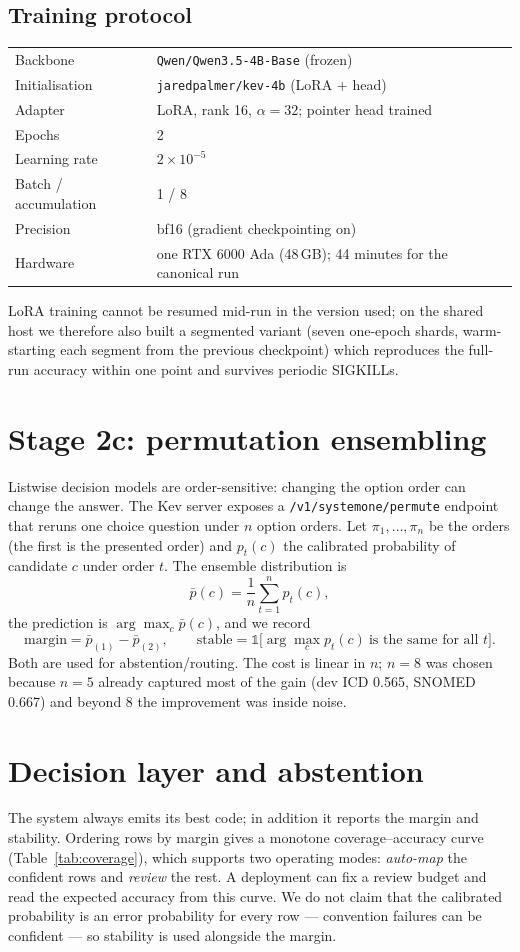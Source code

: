 \documentclass[11pt]{article}
\newcommand{\code}[1]{\texttt{#1}}
\begin{document}
\subsection{Training protocol}
\begin{table}[H]
\centering
\small
\begin{tabular}{@{}ll@{}}
\toprule
Backbone & \code{Qwen/Qwen3.5-4B-Base} (frozen) \\
Initialisation & \code{jaredpalmer/kev-4b} (LoRA + head) \\
Adapter & LoRA, rank 16, $\alpha=32$; pointer head trained \\
Epochs & 2 \\
Learning rate & $2\times10^{-5}$ \\
Batch / accumulation & 1 / 8 \\
Precision & bf16 (gradient checkpointing on) \\
Hardware & one RTX 6000 Ada (48\,GB); 44 minutes for the canonical run \\
\bottomrule
\end{tabular}
\end{table}
LoRA training cannot be resumed mid-run in the version used; on the shared host we therefore
also built a segmented variant (seven one-epoch shards, warm-starting each segment from the
previous checkpoint) which reproduces the full-run accuracy within one point and survives
periodic SIGKILLs.

\section{Stage 2c: permutation ensembling}
Listwise decision models are order-sensitive: changing the option order can change the
answer. The Kev server exposes a \code{/v1/systemone/permute} endpoint that reruns one
choice question under $n$ option orders. Let $\pi_1,\dots,\pi_n$ be the orders (the first is
the presented order) and $p_t(c)$ the calibrated probability of candidate $c$ under order
$t$. The ensemble distribution is
\[
  \bar p(c) = \frac{1}{n}\sum_{t=1}^{n} p_t(c),
\]
the prediction is $\arg\max_c \bar p(c)$, and we record
\[
  \text{margin} = \bar p_{(1)}-\bar p_{(2)},\qquad
  \text{stable} = \mathbb{1}\big[\arg\max_c p_t(c)\ \text{is the same for all } t\big].
\]
Both are used for abstention/routing. The cost is linear in $n$; $n{=}8$ was chosen because
$n{=}5$ already captured most of the gain (dev ICD 0.565, SNOMED 0.667) and beyond 8 the
improvement was inside noise.

\section{Decision layer and abstention}
The system always emits its best code; in addition it reports the margin and stability.
Ordering rows by margin gives a monotone coverage--accuracy curve (Table~\ref{tab:coverage}),
which supports two operating modes: \emph{auto-map} the confident rows and \emph{review} the
rest. A deployment can fix a review budget and read the expected accuracy from this curve.
We do not claim that the calibrated probability is an error probability for every row ---
convention failures can be confident --- so stability is used alongside the margin.
\end{document}
